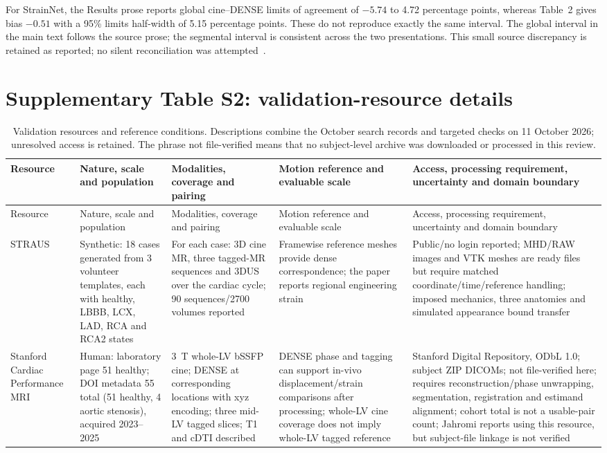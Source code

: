 \documentclass[11pt,a4paper]{article}
\begin{document}
For StrainNet, the Results prose reports global cine--DENSE limits of agreement of \(-5.74\) to 4.72 percentage points, whereas Table~2 gives bias \(-0.51\) with a 95\% limits half-width of 5.15 percentage points. These do not reproduce exactly the same interval. The global interval in the main text follows the source prose; the segmental interval is consistent across the two presentations. This small source discrepancy is retained as reported; no silent reconciliation was attempted~\cite{wang2023strainnet}.

\section*{Supplementary Table S2: validation-resource details}

{\scriptsize\sloppy
\begin{longtable}{L{0.11\textwidth}L{0.14\textwidth}L{0.15\textwidth}L{0.17\textwidth}L{0.23\textwidth}}
\caption{Validation resources and reference conditions. Descriptions combine the October search records and targeted checks on 11 October 2026; unresolved access is retained. The phrase not file-verified means that no subject-level archive was downloaded or processed in this review.}\\
\toprule
Resource & Nature, scale and population & Modalities, coverage and pairing & Motion reference and evaluable scale & Access, processing requirement, uncertainty and domain boundary \\
\midrule
\endfirsthead
\toprule
Resource & Nature, scale and population & Modalities, coverage and pairing & Motion reference and evaluable scale & Access, processing requirement, uncertainty and domain boundary \\
\midrule
\endhead
STRAUS~\cite{zhou2018straus,strausdata} & Synthetic: 18 cases generated from 3 volunteer templates, each with healthy, LBBB, LCX, LAD, RCA and RCA2 states & For each case: 3D cine MR, three tagged-MR sequences and 3DUS over the cardiac cycle; 90 sequences/2700 volumes reported & Framewise reference meshes provide dense correspondence; the paper reports regional engineering strain & Public/no login reported; MHD/RAW images and VTK meshes are ready files but require matched coordinate/time/reference handling; imposed mechanics, three anatomies and simulated appearance bound transfer \\
\addlinespace
Stanford Cardiac Performance MRI~\cite{stanforddata} & Human: laboratory page 51 healthy; DOI metadata 55 total (51 healthy, 4 aortic stenosis), acquired 2023--2025 & 3~T whole-LV bSSFP cine; DENSE at corresponding locations with xyz encoding; three mid-LV tagged slices; T1 and cDTI described & DENSE phase and tagging can support in-vivo displacement/strain comparisons after processing; whole-LV cine coverage does not imply whole-LV tagged reference & Stanford Digital Repository, ODbL 1.0; subject ZIP DICOMs; not file-verified here; requires reconstruction/phase unwrapping, segmentation, registration and estimand alignment; cohort total is not a usable-pair count; Jahromi reports using this resource, but subject-file linkage is not verified \\

\end{longtable}}
\end{document}
